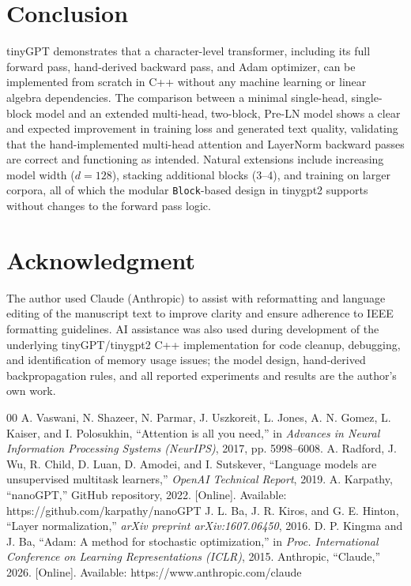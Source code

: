 \documentclass[conference]{IEEEtran}
\begin{document}
\section{Conclusion}
tinyGPT demonstrates that a character-level transformer, including its full forward pass, hand-derived backward pass, and Adam optimizer, can be implemented from scratch in C++ without any machine learning or linear algebra dependencies. The comparison between a minimal single-head, single-block model and an extended multi-head, two-block, Pre-LN model shows a clear and expected improvement in training loss and generated text quality, validating that the hand-implemented multi-head attention and LayerNorm backward passes are correct and functioning as intended. Natural extensions include increasing model width ($d=128$), stacking additional blocks (3--4), and training on larger corpora, all of which the modular \texttt{Block}-based design in tinygpt2 supports without changes to the forward pass logic.

\section*{Acknowledgment}
The author used Claude (Anthropic) \cite{anthropic2026claude} to assist with reformatting and language editing of the manuscript text to improve clarity and ensure adherence to IEEE formatting guidelines. AI assistance was also used during development of the underlying tinyGPT/tinygpt2 C++ implementation for code cleanup, debugging, and identification of memory usage issues; the model design, hand-derived backpropagation rules, and all reported experiments and results are the author's own work.

\begin{thebibliography}{00}
 A. Vaswani, N. Shazeer, N. Parmar, J. Uszkoreit, L. Jones, A. N. Gomez, L. Kaiser, and I. Polosukhin, ``Attention is all you need,'' in \textit{Advances in Neural Information Processing Systems (NeurIPS)}, 2017, pp. 5998--6008.
 A. Radford, J. Wu, R. Child, D. Luan, D. Amodei, and I. Sutskever, ``Language models are unsupervised multitask learners,'' \textit{OpenAI Technical Report}, 2019.
 A. Karpathy, ``nanoGPT,'' GitHub repository, 2022. [Online]. Available: https://github.com/karpathy/nanoGPT
 J. L. Ba, J. R. Kiros, and G. E. Hinton, ``Layer normalization,'' \textit{arXiv preprint arXiv:1607.06450}, 2016.
 D. P. Kingma and J. Ba, ``Adam: A method for stochastic optimization,'' in \textit{Proc. International Conference on Learning Representations (ICLR)}, 2015.
 Anthropic, ``Claude,'' 2026. [Online]. Available: https://www.anthropic.com/claude
\end{thebibliography}
\end{document}

